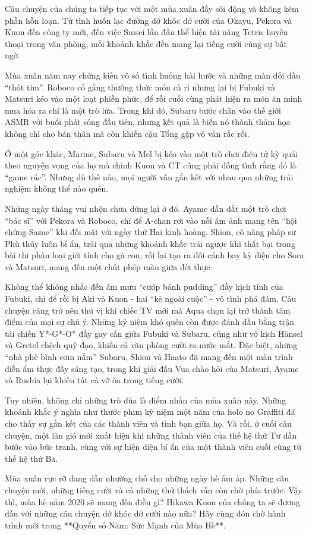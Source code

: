 \documentclass[main.tex]{subfiles}
\begin{document}
Câu chuyện của chúng ta tiếp tục với một mùa xuân đầy sôi động và không kém phần hỗn loạn. Từ tình huốn lạc đường dở khóc dở cười của Okayu, Pekora và Kuon đến công ty mới, đến việc Suisei lần đầu thể hiện tài năng Tetris huyền thoại trong văn phòng, mỗi khoảnh khắc đều mang lại tiếng cười cùng sự bất ngờ.

Mùa xuân năm nay chứng kiến vô số tình huống hài hước và những màn đối đầu ``thót tim''. Roboco cố gắng thưởng thức món cà ri nhưng lại bị Fubuki và Matsuri kéo vào một loạt phiền phức, để rồi cuối cùng phát hiện ra món ăn mình mua hóa ra chỉ là một trò lừa. Trong khi đó, Subaru bước chân vào thế giới ASMR với buổi phát sóng đầu tiên, nhưng kết quả là biến nó thành thảm họa không chỉ cho bản thân mà còn khiến cậu Tổng gặp vô vàn rắc rối.

Ở một góc khác, Marine, Subaru và Mel bị kéo vào một trò chơi điện tử kỳ quái theo nguyện vọng của họ mà chính Kuon và CT cũng phải đồng tình rằng đó là ``game rác''. Nhưng dù thế nào, mọi người vẫn gắn kết với nhau qua những trải nghiệm không thể nào quên. 

Những ngày tháng vui nhộn chưa dừng lại ở đó. Ayame dẫn dắt một trò chơi ``bác sĩ'' với Pekora và Roboco, chỉ để A-chan rơi vào nỗi ám ảnh mang tên ``hội chứng Sazae'' khi đối mặt với ngày thứ Hai kinh hoàng. Shion, cô nàng pháp sư Phù thủy luôn bí ẩn, trải qua những khoảnh khắc trái ngược khi thất bại trong bài thi phân loại giới tính cho gà con, rồi lại tạo ra đôi cánh bay kỳ diệu cho Sora và Matsuri, mang đến một chút phép màu giữa đời thực.

Không thể không nhắc đến âm mưu ``cướp bánh pudding'' đầy kịch tính của Fubuki, chỉ để rồi bị Aki và Kuon - hai ``kẻ ngoài cuộc'' - vô tình phá đám. Câu chuyện càng trở nên thú vị khi chiếc TV mới mà Aqua chọn lại trở thành tâm điểm của mọi sự chú ý. Những kỷ niệm khó quên còn được đánh dấu bằng trận tái chiến Y*-G*-O* đầy gay cấn giữa Fubuki và Subaru, cũng như vở kịch Hänsel và Gretel chệch quỹ đạo, khiến cả văn phòng cười ra nước mắt. Đặc biệt, những ``nhà phê bình cơm nắm'' Subaru, Shion và Haato đã mang đến một màn trình diễn ẩm thực đầy sáng tạo, trong khi giải đấu Vua chào hỏi của Matsuri, Ayame và Rushia lại khiến tất cả vỡ òa trong tiếng cười.

Tuy nhiên, không chỉ những trò đùa là điểm nhấn của mùa xuân này. Những khoảnh khắc ý nghĩa như thước phim kỷ niệm một năm của holo no Graffiti đã cho thấy sự gắn kết của các thành viên và tình bạn giữa họ. Và rồi, ở cuối câu chuyện, một làn gió mới xuất hiện khi những thành viên của thế hệ thứ Tư dần bước vào bức tranh, cùng với sự hiện diện bí ẩn của một thành viên cuối cùng từ thế hệ thứ Ba.

Mùa xuân rực rỡ đang dần nhường chỗ cho những ngày hè ấm áp. Những câu chuyện mới, những tiếng cười và cả những thử thách vẫn còn chờ phía trước. Vậy thì, mùa hè năm 2020 sẽ mang đến điều gì? Hikawa Kuon của chúng ta sẽ đương đầu với những câu chuyện dở khóc dở cười nào nữa? Hãy cùng đón chờ hành trình mới trong **Quyển số Năm: Sức Mạnh của Mùa Hè**.
\end{document}
